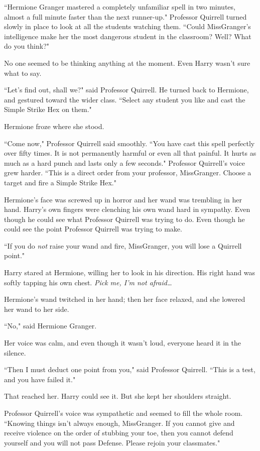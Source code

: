 ``Hermione Granger mastered a completely unfamiliar spell in two minutes, almost a full minute faster than the next runner-up." Professor Quirrell turned slowly in place to look at all the students watching them. ``Could Miss\?Granger's intelligence make her the most dangerous student in the classroom? Well? What do you think?"

No one seemed to be thinking anything at the moment. Even Harry wasn't sure what to say.

``Let's find out, shall we?" said Professor Quirrell. He turned back to Hermione, and gestured toward the wider class. ``Select any student you like and cast the Simple Strike Hex on them."

Hermione froze where she stood.

``Come now," Professor Quirrell said smoothly. ``You have cast this spell perfectly over fifty times. It is not permanently harmful or even all that painful. It hurts as much as a hard punch and lasts only a few seconds." Professor Quirrell's voice grew harder. ``This is a direct order from your professor, Miss\?Granger. Choose a target and fire a Simple Strike Hex."

Hermione's face was screwed up in horror and her wand was trembling in her hand. Harry's own fingers were clenching his own wand hard in sympathy. Even though he could see what Professor Quirrell was trying to do. Even though he could see the point Professor Quirrell was trying to make.

``If you do \emph{not} raise your wand and fire, Miss\?Granger, you will lose a Quirrell point."

Harry stared at Hermione, willing her to look in his direction. His right hand was softly tapping his own chest. \emph{Pick me, I'm not afraid{\ldots}}

Hermione's wand twitched in her hand; then her face relaxed, and she lowered her wand to her side.

``No," said Hermione Granger.

Her voice was calm, and even though it wasn't loud, everyone heard it in the silence.

``Then I must deduct one point from you," said Professor Quirrell. ``This is a test, and you have failed it."

That reached her. Harry could see it. But she kept her shoulders straight.

Professor Quirrell's voice was sympathetic and seemed to fill the whole room. ``Knowing things isn't always enough, Miss\?Granger. If you cannot give and receive violence on the order of stubbing your toe, then you cannot defend yourself and you will not pass Defense. Please rejoin your classmates."

